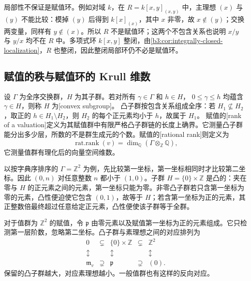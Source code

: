 局部性不保证是赋值环。例如对域 \(k\)，在 \(R=k[x,y]_{(x,y)}\) 中，主理想 \((x)\) 与 \((y)\) 不能比较：模掉 \((y)\) 后得到 \(k[x]_{(x)}\)，其中 \(x\) 非零，故 \(x\notin(y)\)；交换两变量，同样有 \(y\notin(x)\)。所以 \(R\) 不是赋值环；这两个不包含关系也说明 \(x/y\) 与 \(y/x\) 均不在 \(R\) 中。多项式环 \(k[x,y]\) 整闭，由\cref{b3:cor:integrally-closed-localization}，\(R\) 也整闭，因此整闭局部环仍不必是赋值环。

\subsection{赋值的秩与赋值环的 Krull 维数}
\label{b3:subsec:1001:04}

设 \(\Gamma\) 为全序交换群，\(H\) 为其子群。若对所有 \(\gamma\in\Gamma\) 和 \(h\in H\)， \(0\le\gamma\le h\) 均蕴含 \(\gamma\in H\)，则称 \(H\) 为[convex subgroup]。 凸子群按包含关系组成全序：若 \(H_1\not\subseteq H_2\)，取正的 \(h\in H_1\setminus H_2\)，则 \(H_2\) 的每个正元素均小于 \(h\)，故属于 \(H_1\)。 赋值的[rank of a valuation]定义为其赋值群中有限严格凸子群链的长度上确界。它测量凸子群能分出多少层，所数的不是群生成元的个数。赋值的[rational rank]则定义为
\[
	\operatorname{rat.rank}(v) =\dim_{\mathbb Q}(\Gamma\otimes_{\mathbb Z}\mathbb Q),
\]
它测量值群有理化后的向量空间维数。

\begin{samepage}
	以按字典序排序的 \(\Gamma=\mathbb Z^2\) 为例，先比较第一坐标，第一坐标相同时才比较第二坐标。因此 \((0,n)\) 对任意整数 \(n\) 都小于 \((1,0)\)。子群 \(H=\{0\}\times\mathbb Z\) 是凸的：夹在零与 \(H\) 的正元素之间的元素，第一坐标只能为零。非零凸子群若只含第一坐标为零的元素，凸性便迫使它包含 \((0,1)\)，故等于 \(H\)；若含第一坐标为正的元素，其正整数倍最终超过任意给定正元素，凸性便使该子群等于全群。

	\ProseParagraphBreak
	对于值群为 \(\mathbb Z^2\) 的赋值，令 \(\mathfrak p\) 由零元素以及赋值第一坐标为正的元素组成。它只检测第一层阶数，忽略第二坐标。凸子群与素理想之间的对应排列为
	\[
		\begin{array}{ccccc}
			0&\subsetneq&\{0\}\times\mathbb Z&\subsetneq&\mathbb Z^2\\
			\updownarrow&&\updownarrow&&\updownarrow\\
			\mathfrak m_v&\supsetneq&\mathfrak p&\supsetneq&(0).
		\end{array}
	\]
	保留的凸子群越大，对应素理想越小。一般值群也有这样的反向对应。
\end{samepage}

